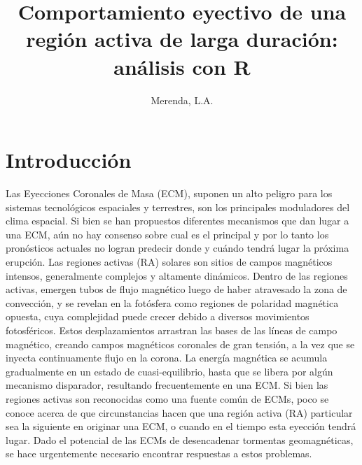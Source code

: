 \documentclass[12pt,a4paper,spanish]{article}
\title{Comportamiento eyectivo de una región activa de larga duración: análisis con R}
\author[1]{Merenda, L.A.}
\affil[1]{Facultad de Ciencias Exactas y Naturales. Universidad Nacional de Cuyo}
\date{\vspace{-5ex}}
\begin{document}
\maketitle
\pagestyle{fancy}
\thispagestyle{fancy}


\renewcommand{\abstract}{Resumen}

\vspace{8ex}

\section{Introducción}
 Las Eyecciones Coronales de Masa (ECM), suponen un alto peligro para los sistemas tecnológicos espaciales y terrestres, son los principales moduladores del clima espacial. Si bien se han propuestos diferentes mecanismos que dan lugar a una ECM, aún no hay consenso sobre cual es el principal y por lo tanto los pronósticos actuales no logran predecir donde y cuándo tendrá lugar la próxima erupción.
 Las regiones activas (RA) solares son sitios de campos magnéticos intensos, generalmente complejos y altamente dinámicos. Dentro de las regiones activas, emergen tubos de flujo magnético luego de haber atravesado la zona de convección, y se revelan en la fotósfera como regiones de polaridad magnética opuesta, cuya complejidad puede crecer debido a diversos movimientos fotosféricos. Estos desplazamientos arrastran las bases de las líneas de campo magnético, creando campos magnéticos coronales de gran tensión, a la vez que se inyecta continuamente flujo en la corona. La energía magnética se acumula gradualmente en un estado de cuasi-equilibrio, hasta que se libera por algún mecanismo disparador, resultando frecuentemente en una ECM. Si bien las regiones activas son reconocidas como una fuente común de ECMs, poco se conoce acerca de que circunstancias hacen que una región activa (RA) particular sea la siguiente en originar una ECM, o cuando en el tiempo esta eyección tendrá lugar. Dado el potencial de las ECMs de desencadenar tormentas geomagnéticas, se hace urgentemente necesario encontrar respuestas a estos problemas.
\end{document}
